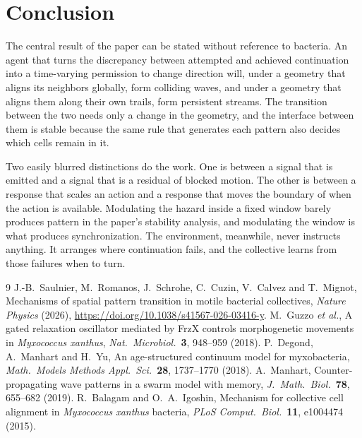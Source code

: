 \documentclass[11pt]{article}
\theoremstyle{definition}
\theoremstyle{remark}
\begin{document}
\section{Conclusion}

The central result of the paper can be stated without reference to bacteria. An agent that turns the discrepancy between attempted and achieved continuation into a time-varying permission to change direction will, under a geometry that aligns its neighbors globally, form colliding waves, and under a geometry that aligns them along their own trails, form persistent streams. The transition between the two needs only a change in the geometry, and the interface between them is stable because the same rule that generates each pattern also decides which cells remain in it.

Two easily blurred distinctions do the work. One is between a signal that is emitted and a signal that is a residual of blocked motion. The other is between a response that scales an action and a response that moves the boundary of when the action is available. Modulating the hazard inside a fixed window barely produces pattern in the paper's stability analysis, and modulating the window is what produces synchronization. The environment, meanwhile, never instructs anything. It arranges where continuation fails, and the collective learns from those failures when to turn.

\begin{thebibliography}{9}
 J.-B.~Saulnier, M.~Romanos, J.~Schrohe, C.~Cuzin, V.~Calvez and T.~Mignot, Mechanisms of spatial pattern transition in motile bacterial collectives, \emph{Nature Physics} (2026), \url{https://doi.org/10.1038/s41567-026-03416-y}.
 M.~Guzzo \emph{et al.}, A gated relaxation oscillator mediated by FrzX controls morphogenetic movements in \emph{Myxococcus xanthus}, \emph{Nat.\ Microbiol.}\ \textbf{3}, 948--959 (2018).
 P.~Degond, A.~Manhart and H.~Yu, An age-structured continuum model for myxobacteria, \emph{Math.\ Models Methods Appl.\ Sci.}\ \textbf{28}, 1737--1770 (2018).
 A.~Manhart, Counter-propagating wave patterns in a swarm model with memory, \emph{J.\ Math.\ Biol.}\ \textbf{78}, 655--682 (2019).
 R.~Balagam and O.~A.~Igoshin, Mechanism for collective cell alignment in \emph{Myxococcus xanthus} bacteria, \emph{PLoS Comput.\ Biol.}\ \textbf{11}, e1004474 (2015).
\end{thebibliography}
\end{document}
